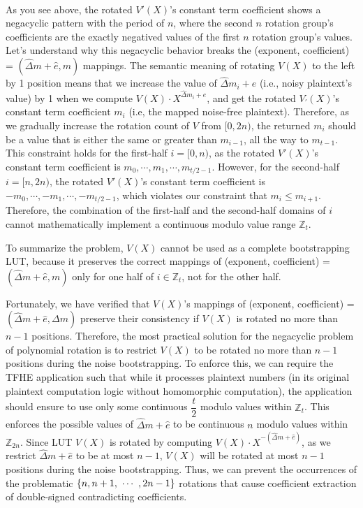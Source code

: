 $ $

As you see above, the rotated $V'(X)$'s constant term coefficient shows a negacyclic pattern with the period of $n$, where the second $n$ rotation group's coefficients are the exactly negatived values of the first $n$ rotation group's values. Let's understand why this negacyclic behavior breaks the (exponent, coefficient) = $(\hat{\Delta} m + \hat e, m)$ mappings. The semantic meaning of rotating $V(X)$ to the left by 1 position means that we increase the value of $\hat{\Delta}m_i + e$ (i.e., noisy plaintext's value) by 1 when we compute $V(X)\cdot X^{\hat{\Delta}m_i + e}$, and get the rotated ${V}_{'}(X)$'s constant term coefficient $m_i$ (i.e, the mapped noise-free plaintext). Therefore, as we gradually increase the rotation count of $V$ from $[0, 2n)$, the returned $m_i$ should be a value that is either the same or greater than $m_{i-1}$, all the way to $m_{t - 1}$. This constraint holds for the first-half $i = [0, n)$, as the rotated $V'(X)$'s constant term coefficient is $m_0, \cdots, m_1, \cdots, m_{t/2 - 1}$. However, for the second-half $i = [n, 2n)$, the rotated $V'(X)$'s constant term coefficient is $-m_0, \cdots, -m_1, \cdots, -m_{t/2 - 1}$, which violates our constraint that $m_i \leq m_{i+1}$. Therefore, the combination of the first-half and the second-half domains of $i$ cannot mathematically implement a continuous modulo value range $\mathbb{Z}_t$. 

To summarize the problem, $V(X)$ cannot be used as a complete bootstrapping LUT, because it preserves the correct mappings of (exponent, coefficient) = $(\hat{\Delta} m + \hat e, m)$ only for one half of $i \in \mathbb{Z}_t$, not for the other half. 

Fortunately, we have verified that $V(X)$'s mappings of (exponent, coefficient) = $(\hat{\Delta} m + \hat e, \Delta m)$ preserve their consistency if $V(X)$ is rotated no more than $n-1$ positions. Therefore, the most practical solution for the negacyclic problem of polynomial rotation is to restrict $V(X)$ to be rotated no more than $n-1$ positions during the noise bootstrapping. To enforce this, we can require the TFHE application such that while it processes plaintext numbers (in its original plaintext computation logic without homomorphic computation), the application should ensure to use only some continuous $\dfrac{t}{2}$ modulo values within $\mathbb{Z}_t$. This enforces the possible values of $\hat\Delta m + \hat e$ to be continuous $n$ modulo values within $\mathbb{Z}_{2n}$. Since LUT $V(X)$ is rotated by computing $V(X)\cdot X^{-(\hat\Delta m + \hat e)}$, as we restrict $\hat\Delta m + \hat e$ to be at most $n-1$, $V(X)$ will be rotated at most $n-1$ positions during the noise bootstrapping. Thus, we can prevent the occurrences of the problematic $\{n, n+1, \text{ } \text{$\cdots$} \text{ }, 2n -1 \}$ rotations that cause coefficient extraction of double-signed contradicting coefficients. 

